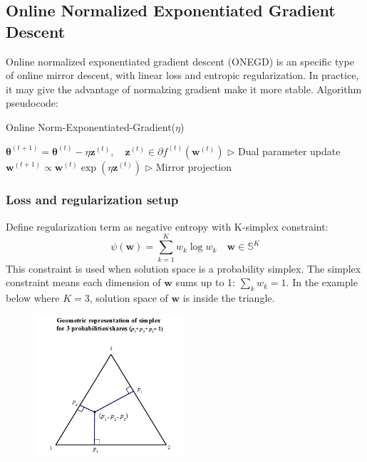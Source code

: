 \documentclass[11pt]{article}
\begin{document}
\subsection{Online Normalized Exponentiated Gradient Descent}
Online normalized exponentiated gradient descent (ONEGD) is an specific type of online mirror descent, with linear loss and entropic regularization. In practice, it may give the advantage of normalzing gradient make it more stable. Algorithm pseudocode:

\begin{algorithm}[H]
\caption{Online Norm-Exponentiated-Gradient($\eta$)}
\label{algo:onegd}
\begin{algorithmic}[1]
\STATE $\boldsymbol{\theta}^{(t+1)} = \boldsymbol{\theta}^{(t)} - \eta \boldsymbol{z}^{(t)}, \quad \boldsymbol{z}^{(t)} \in \partial f^{(t)}(\boldsymbol{w}^{(t)})$ \hfill $\triangleright$ Dual parameter update
\STATE $\boldsymbol{w}^{(t+1)} \propto \boldsymbol{w}^{(t)} \exp{(\eta \boldsymbol{z}^{(t)})}$ \hfill $\triangleright$ Mirror projection
\ENDFOR
\end{algorithmic}
\end{algorithm}

\subsubsection{Loss and regularization setup}
Define regularization term as negative entropy with K-simplex constraint:
\[ \psi(\boldsymbol{w}) = \sum_{k=1}^{K} w_k \log w_k \quad \boldsymbol{w} \in \mathbb{S}^K \]
This constraint is used when solution space is a probability simplex. The simplex constraint means each dimension of $\boldsymbol{w}$ sums up to 1: $\sum_k w_k = 1$. In the example below where $K=3$, solution space of $\boldsymbol{w}$ is inside the triangle.
\begin{figure}[H]
    \centering
    \includegraphics[width=0.5\textwidth]{pic/probability simplex.png} \cite{simplex_img}
\end{figure}
\end{document}
